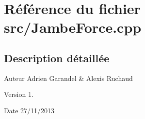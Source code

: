 \section{Référence du fichier src/\-Jambe\-Force.cpp}
\label{_jambe_force_8cpp}


\subsection{Description détaillée}
\begin{DoxyAuthor}{Auteur}
Adrien Garandel \& Alexis Ruchaud 
\end{DoxyAuthor}
\begin{DoxyVersion}{Version}
1. 
\end{DoxyVersion}
\begin{DoxyDate}{Date}
27/11/2013 
\end{DoxyDate}
